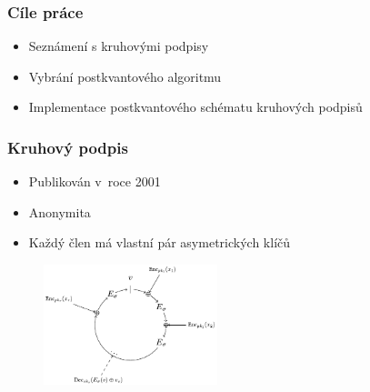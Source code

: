 \documentclass[%
  12pt,       				%
	t,                  %
	aspectratio=1610,   %
	unicode,						%
]{beamer}				    	%
\begin{document}
\disablenavigationsymbols

\maketitle

\begin{frame}[c]
    \large{
	\frametitle{Cíle práce}
    \begin{itemize}
        \item Seznámení s kruhovými podpisy
        \item Vybrání postkvantového algoritmu
        \item Implementace postkvantového schématu kruhových podpisů
    \end{itemize}
}
\end{frame}

\begin{frame} 
	\frametitle{Kruhový podpis}
    \large{
    \begin{itemize}
        \item Publikován v~roce 2001
        \item Anonymita
        \item Každý člen má vlastní pár asymetrických klíčů
    \end{itemize}
    }
	\begin{figure}[htbp]
  \centering
  \includegraphics[width=0.45\textwidth]{img/ring_signature.pdf}
  
  
\end{figure}
\end{frame}
\end{document}
